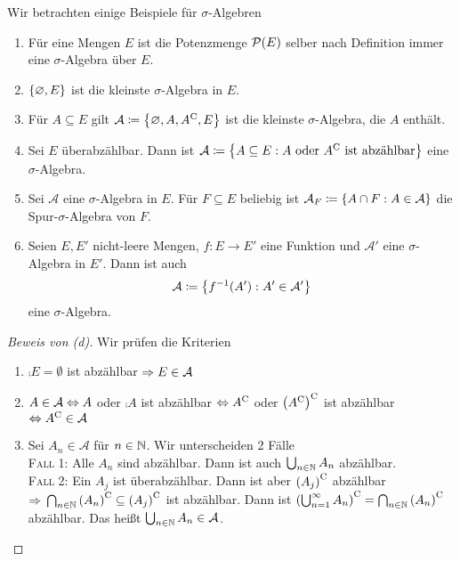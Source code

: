 \begin{beispiel}
    \label{beispiel:sigma-algebren}
    Wir betrachten einige Beispiele für $\sigma$-Algebren
    \begin{enumerate}[label=(\alph*)]
        \item Für eine Mengen $E$ ist die Potenzmenge $\mathcal{P}\of{E}$ selber nach Definition immer eine $\sigma$-Algebra über $E$.
        \item $\left\{\varnothing, E\right\}$ ist die kleinste $\sigma$-Algebra in $E$.
        \item Für $A \subseteq E$ gilt $\mathcal{A} \coloneqq \left\{\varnothing, A, {A}^{\mathrm{C}}, E\right\}$ ist die kleinste $\sigma$-Algebra, die $A$ enthält.
        \item Sei $E$ überabzählbar. Dann ist $\mathcal{A} \coloneqq \left\{A\subseteq E: A \text{ oder }{A}^{\mathrm{C}}\text{ ist abzählbar}\right\}$ eine $\sigma$-Algebra.
        \item Sei $\mathcal{A}$ eine $\sigma$-Algebra in $E$. Für $F\subseteq E$ beliebig ist $\mathcal{A}_F \coloneqq \left\{A \cap F: A\in\mathcal{A}\right\}$ die Spur-$\sigma$-Algebra von $F$.
        \item Seien $E, E'$ nicht-leere Mengen, $f: E\to E'$ eine Funktion und $\mathcal{A}'$ eine $\sigma$-Algebra in $E'$. Dann ist auch
        \begin{align*}
            \mathcal{A} \coloneqq \set{f^{-1}\of{A'}: A'\in\mathcal{A}'}
        \end{align*}
        eine $\sigma$-Algebra.
    \end{enumerate}

    \begin{proof}[Beweis von (d)]
        Wir prüfen die Kriterien
        \begin{enumerate}[label=($\Sigma_{\arabic*}$)]
            \item $\comp{E} = \emptyset$ ist abzählbar $\Rightarrow{} E\in\mathcal{A}$
            \item $A\in\mathcal{A} \Leftrightarrow{} A$ oder $\comp{A}$ ist abzählbar $\Leftrightarrow{} {A}^{\mathrm{C}}$ oder ${\left({A}^{\mathrm{C}}\right)}^{\mathrm{C}}$ ist abzählbar $\Leftrightarrow{} {A}^{\mathrm{C}} \in\mathcal{A}$
            \item Sei $A_n \in\mathcal{A}$ für $n\in\mathbb{N}$. Wir unterscheiden 2 Fälle\\
            \textsc{Fall 1}: Alle $A_n$ sind abzählbar. Dann ist auch $\bigcup_{n\in\mathbb{N}} A_n$ abzählbar.\\
            \textsc{Fall 2}: Ein $A_j$ ist überabzählbar. Dann ist aber ${\left(A_j\right)}^{\mathrm{C}}$ abzählbar $\Rightarrow{}\bigcap_{n\in\mathbb{N}} {\left(A_n\right)}^{\mathrm{C}} \subseteq {\left(A_j\right)}^{\mathrm{C}}$ ist abzählbar. Dann ist ${\left(\bigcup_{n=1}^{\infty} A_n\right)}^{\mathrm{C}} = \bigcap_{n\in\mathbb{N}} {\left(A_n\right)}^{\mathrm{C}}$ abzählbar. Das heißt $\bigcup_{n\in\mathbb{N}} A_n \in\mathcal{A}$.\qedhere
        \end{enumerate}
    \end{proof}
\end{beispiel}

